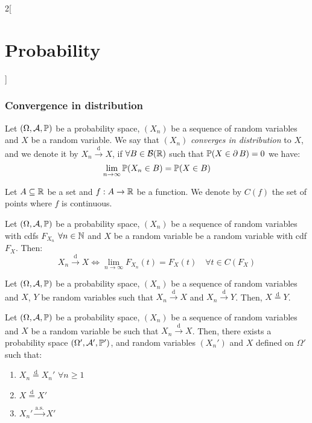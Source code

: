 \documentclass[../../../main.tex]{subfiles}
\begin{document}
\begin{multicols}{2}[\section{Probability}]
  \subsubsection{Convergence in distribution}
  \begin{definition}
    Let $(\Omega,\mathcal{A},\mathbb{P})$ be a probability space, $(X_n)$ be a sequence of random variables and $X$ be a random variable. We say that $(X_n)$ \emph{converges in distribution} to $X$, and we denote it by $X_n\overset{\text{d}}{\longrightarrow} X$, if $\forall B\in\mathcal{B}(\mathbb{R})$ such that $\mathbb{P}(X\in\operatorname{\partial} B)=0$ we have: $$\lim_{n\to\infty}\mathbb{P}(X_n\in B)=\mathbb{P}(X\in B)$$
  \end{definition}
  \begin{definition}
    Let $A\subseteq\mathbb{R}$ be a set and $f:A\rightarrow\mathbb{R}$ be a function. We denote by $C(f)$ the set of points where $f$ is continuous.
  \end{definition}
  \begin{prop}
    Let $(\Omega,\mathcal{A},\mathbb{P})$ be a probability space, $(X_n)$ be a sequence of random variables with cdfs $F_{X_n}$ $\forall n\in\mathbb{N}$ and $X$ be a random variable be a random variable with cdf $F_X$. Then: $$X_n\overset{\text{d}}{\longrightarrow} X\iff\lim_{n\to\infty} F_{X_n}(t)=F_X(t)\quad\forall t\in C(F_X)$$
  \end{prop}
  \begin{prop}
    Let $(\Omega,\mathcal{A},\mathbb{P})$ be a probability space, $(X_n)$ be a sequence of random variables and $X$, $Y$ be random variables such that $X_n\overset{\text{d}}{\longrightarrow} X$ and $X_n\overset{\text{d}}{\longrightarrow} Y$. Then, $X\overset{\text{d}}{=}Y$.
  \end{prop}
  \begin{theorem}
    Let $(\Omega,\mathcal{A},\mathbb{P})$ be a probability space, $(X_n)$ be a sequence of random variables and $X$ be a random variable be such that $X_n\overset{\text{d}}{\longrightarrow} X$. Then, there exists a probability space $(\Omega',\mathcal{A}',\mathbb{P}')$, and random variables $({X_n}')$ and $X$ defined on $\Omega'$ such that:
    \begin{enumerate}
      \item $X_n\overset{\text{d}}{=}{X_n}'$ $\forall n\geq 1$
      \item $X\overset{\text{d}}{=}X'$
      \item ${X_n}'\overset{\text{a.s.}}{\longrightarrow}X'$
    \end{enumerate}

\end{theorem}
\end{multicols}
\end{document}
